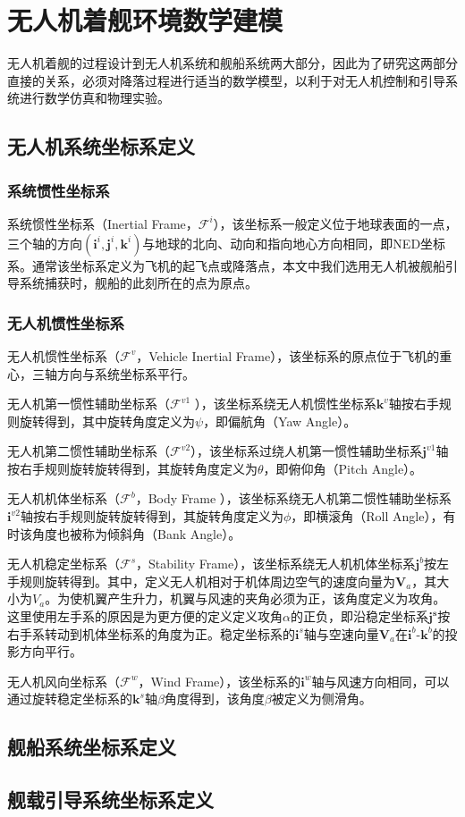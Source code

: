 \chapter{无人机着舰环境数学建模}
\label{chap:main}
无人机着舰的过程设计到无人机系统和舰船系统两大部分，因此为了研究这两部分直接的关系，必须对降落过程进行适当的数学模型，以利于对无人机控制和引导系统进行数学仿真和物理实验。

\section{无人机系统坐标系定义}

\subsection{系统惯性坐标系}
系统惯性坐标系（Inertial Frame，$\mathcal{F}^i$），该坐标系一般定义位于地球表面的一点，三个轴的方向$(\mathbf{i}^i, \mathbf{j}^i,\mathbf{k}^i)$与地球的北向、动向和指向地心方向相同，即NED坐标系。通常该坐标系定义为飞机的起飞点或降落点，本文中我们选用无人机被舰船引导系统捕获时，舰船的此刻所在的点为原点。

\subsection{无人机惯性坐标系}
无人机惯性坐标系（$\mathcal{F}^v$，Vehicle Inertial Frame），该坐标系的原点位于飞机的重心，三轴方向与系统坐标系平行。

无人机第一惯性辅助坐标系（$\mathcal{F}^{v1}$ ），该坐标系绕无人机惯性坐标系$\mathbf{k}^v$轴按右手规则旋转得到，其中旋转角度定义为$\psi$，即偏航角（Yaw Angle）。

无人机第二惯性辅助坐标系（$\mathcal{F}^{v2}$），该坐标系过绕人机第一惯性辅助坐标系$\mathbf{j}^{v1}$轴按右手规则旋转旋转得到，其旋转角度定义为$\theta$，即俯仰角（Pitch Angle）。

无人机机体坐标系（$\mathcal{F}^b$，Body Frame ），该坐标系绕无人机第二惯性辅助坐标系$\mathbf{i}^{v2}$轴按右手规则旋转旋转得到，其旋转角度定义为$\phi$，即横滚角（Roll Angle），有时该角度也被称为倾斜角（Bank Angle）。

无人机稳定坐标系（$\mathcal{F}^s$，Stability Frame），该坐标系绕无人机机体坐标系$\mathbf{j}^b$按左手规则旋转得到。其中，定义无人机相对于机体周边空气的速度向量为$\mathbf{V}_a$，其大小为$V_a$。为使机翼产生升力，机翼与风速的夹角必须为正，该角度定义为攻角。这里使用左手系的原因是为更方便的定义定义攻角$\alpha$的正负，即沿稳定坐标系$\mathbf{j^s}$按右手系转动到机体坐标系的角度为正。稳定坐标系的$\mathbf{i}^s$轴与空速向量$\mathbf{V}_a$在$\mathbf{i}^b$-$\mathbf{k}^b$的投影方向平行。

无人机风向坐标系（$\mathcal{F}^w$，Wind Frame），该坐标系的$\mathbf{i}^w$轴与风速方向相同，可以通过旋转稳定坐标系的$\mathbf{k}^s$轴$\beta$角度得到，该角度$\beta$被定义为侧滑角。



\section{舰船系统坐标系定义}


\section{舰载引导系统坐标系定义}
 
